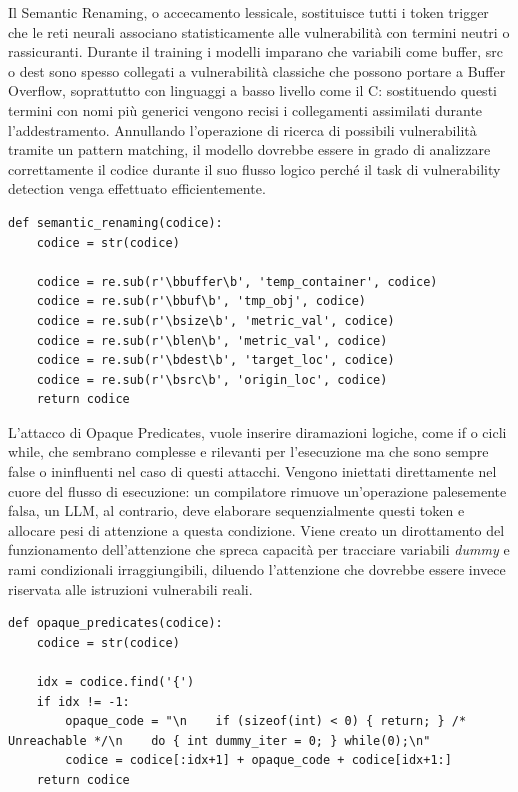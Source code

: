 Il Semantic Renaming, o accecamento lessicale, sostituisce tutti i token trigger che le reti neurali associano statisticamente alle vulnerabilità con termini neutri o rassicuranti. Durante il training i modelli imparano che variabili come buffer, src o dest sono spesso collegati a vulnerabilità classiche che possono portare a Buffer Overflow, soprattutto con linguaggi a basso livello come il C: sostituendo questi termini con nomi più generici vengono recisi i collegamenti assimilati durante l'addestramento. Annullando l'operazione di ricerca di possibili vulnerabilità tramite un pattern matching, il modello dovrebbe essere in grado di analizzare correttamente il codice durante il suo flusso logico perché il task di vulnerability detection venga effettuato efficientemente.

\begin{verbatim}
def semantic_renaming(codice):
    codice = str(codice)

    codice = re.sub(r'\bbuffer\b', 'temp_container', codice)
    codice = re.sub(r'\bbuf\b', 'tmp_obj', codice)
    codice = re.sub(r'\bsize\b', 'metric_val', codice)
    codice = re.sub(r'\blen\b', 'metric_val', codice)
    codice = re.sub(r'\bdest\b', 'target_loc', codice)
    codice = re.sub(r'\bsrc\b', 'origin_loc', codice)
    return codice
\end{verbatim}

L'attacco di Opaque Predicates, vuole inserire diramazioni logiche, come if o cicli while, che sembrano complesse e rilevanti per l'esecuzione ma che sono sempre false o ininfluenti nel caso di questi attacchi.
Vengono iniettati direttamente nel cuore del flusso di esecuzione: un compilatore rimuove un'operazione palesemente falsa, un LLM, al contrario, deve elaborare sequenzialmente questi token e allocare pesi di attenzione a questa condizione.
Viene creato un dirottamento del funzionamento dell'attenzione che spreca capacità per tracciare variabili \textit{dummy} e rami condizionali irraggiungibili, diluendo l'attenzione che dovrebbe essere invece riservata alle istruzioni vulnerabili reali.\\

\begin{verbatim}
def opaque_predicates(codice):
    codice = str(codice)

    idx = codice.find('{')
    if idx != -1:
        opaque_code = "\n    if (sizeof(int) < 0) { return; } /* Unreachable */\n    do { int dummy_iter = 0; } while(0);\n"
        codice = codice[:idx+1] + opaque_code + codice[idx+1:]
    return codice
\end{verbatim}

